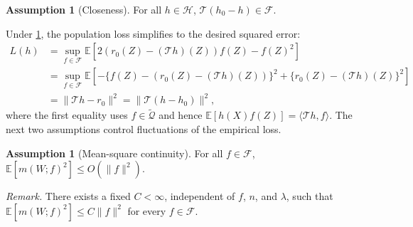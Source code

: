 \documentclass[12pt]{article}
\theoremstyle{plain}
\theoremstyle{definition}
\newtheorem{assumption}[theorem]{Assumption}
\theoremstyle{remark}
\begin{document}
\begin{assumption}[Closeness]\label{asp:closeness}
    For all $h \in \mathcal{H}$, $\mathcal T(h_0-h)\in\mathcal F$.
\end{assumption}

Under \cref{asp:closeness}, the population loss simplifies to the desired squared error:
\begin{align*}
    L(h) & = \sup_{f\in\mathcal F}\mathbb{E}\left[ 2(r_0(Z)-(\mathcal T h)(Z))f(Z) - f(Z)^{2}\right] \\
    & = \sup_{f\in\mathcal F}\mathbb{E}\left[-\{f(Z)-(r_0(Z)-(\mathcal T h)(Z))\}^2 +\{r_0(Z)-(\mathcal T h)(Z)\}^2\right] \\
    & = \|\mathcal T h-r_0\|^2 = \|\mathcal{T}(h-h_0)\|^2,
\end{align*}
where the first equality uses $f\in\tilde{\mathcal Q}$ and hence
$\mathbb E[h(X)f(Z)]=\langle\mathcal T h,f\rangle$.
The next two assumptions control fluctuations of the empirical loss. 

\begin{assumption}[Mean-square continuity]\label{asp:mean_sq_continuity}
 For all $ f\in \mathcal{F}$, $ \mathbb{E}\left[ m( W;f)^{2}\right] \leqslant O\left( \| f\| ^{2}\right)$. 
\end{assumption}

\noindent\textit{Remark.} There exists a fixed $C<\infty$, independent of $f$, $n$, and $\lambda$, such that $\mathbb E[m(W;f)^2]\leqslant C\|f\|^2$ for every $f\in\mathcal F$.
\end{document}
